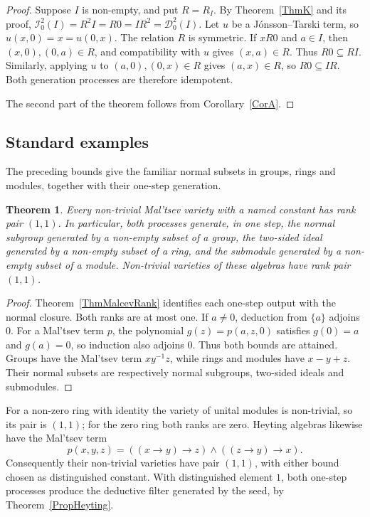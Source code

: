 \documentclass[12pt,english]{amsart}
\newtheorem{theorem}{Theorem}[section]
\theoremstyle{definition}
\numberwithin{equation}{section}
\theoremstyle{remark}
\begin{document}
\begin{proof}
Suppose $I$ is non-empty, and put $R=R_I$. By Theorem~\ref{ThmK} and its proof, $\mathcal I_0^2(I)=R^2I=R0=IR^2=\mathcal D_0^2(I)$. Let $u$ be a J\'onsson--Tarski term, so $u(x,0)=x=u(0,x)$. The relation $R$ is symmetric. If $xR0$ and $a\in I$, then $(x,0),(0,a)\in R$, and compatibility with $u$ gives $(x,a)\in R$. Thus $R0\subseteq RI$. Similarly, applying $u$ to $(a,0),(0,x)\in R$ gives $(a,x)\in R$, so $R0\subseteq IR$. Both generation processes are therefore idempotent.

The second part of the theorem follows from Corollary~\ref{CorA}.
\end{proof}



\subsection{Standard examples}\label{SubsecStandardExamples}

The preceding bounds give the familiar normal subsets in groups, rings and modules, together with their one-step generation.

\begin{theorem}\label{PropStandardRanks}
Every non-trivial Mal'tsev variety with a named constant has rank pair $(1,1)$. In particular, both processes generate, in one step, the normal subgroup generated by a non-empty subset of a group, the two-sided ideal generated by a non-empty subset of a ring, and the submodule generated by a non-empty subset of a module. Non-trivial varieties of these algebras have rank pair $(1,1)$.
\end{theorem}

\begin{proof}
Theorem~\ref{ThmMalcevRank} identifies each one-step output with the normal closure. Both ranks are at most one. If $a\ne0$, deduction from $\{a\}$ adjoins $0$. For a Mal'tsev term $p$, the polynomial $g(z)=p(a,z,0)$ satisfies $g(0)=a$ and $g(a)=0$, so induction also adjoins $0$. Thus both bounds are attained. Groups have the Mal'tsev term $xy^{-1}z$, while rings and modules have $x-y+z$. Their normal subsets are respectively normal subgroups, two-sided ideals and submodules.
\end{proof}

For a non-zero ring with identity the variety of unital modules is non-trivial, so its pair is $(1,1)$; for the zero ring both ranks are zero. Heyting algebras likewise have the Mal'tsev term
\[
p(x,y,z)=((x\to y)\to z)\wedge((z\to y)\to x).
\]
Consequently their non-trivial varieties have pair $(1,1)$, with either bound chosen as distinguished constant. With distinguished element $1$, both one-step processes produce the deductive filter generated by the seed, by Theorem~\ref{PropHeyting}.
\end{document}
